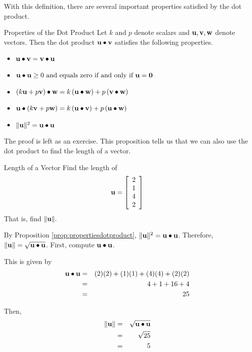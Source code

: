 With this definition, there are several important properties satisfied
by the dot product.

\begin{proposition}{Properties of the Dot Product}\label{prop:propertiesdotproduct}
Let $k $ and $p $  denote scalars and $\mathbf{u},\mathbf{v},\mathbf{w}$ denote vectors.
Then the dot product $\mathbf{u} \bullet \mathbf{v}$ satisfies the following properties.
\begin{itemize}
\item
$\mathbf{u}\bullet \mathbf{v}= \mathbf{v}\bullet \mathbf{u} $
\item
$\mathbf{u}\bullet \mathbf{u}\geq 0 \mbox{ and equals zero if and only if }\mathbf{u}=\mathbf{0}$
\item
$\left( k\mathbf{u}+p\mathbf{v}\right) \bullet \mathbf{w}=k\left( \mathbf{u}\bullet \mathbf{w}\right) +p\left( \mathbf{v}\bullet \mathbf{w}\right)$
\item
$\mathbf{u}\bullet\left( k\mathbf{v}+p\mathbf{w}\right) =k\left(
\mathbf{u}\bullet \mathbf{v}\right) +p\left( \mathbf{u}\bullet \mathbf{w}\right)$
\item
$\| \mathbf{u}\| ^{2}=\mathbf{u}\bullet \mathbf{u} $
\end{itemize}
\end{proposition}

The proof is left as an exercise. This proposition tells us that we can also use the dot product to find the length of a vector.

\begin{example}{Length of a Vector}\label{exa:dotproductlength}
Find the length of
\begin{equation*}
\mathbf{u}
=
\left[ 
\begin{array}{r}
2 \\
1 \\
4 \\
2
\end{array}
\right] 
\end{equation*}
 That is, find $\| \mathbf{u} \| .$
\end{example}

\begin{solution}
By Proposition \ref{prop:propertiesdotproduct},  $\| \mathbf{u} \| ^{2} = \mathbf{u} \bullet \mathbf{u}$. 
Therefore, $\| \mathbf{u} \| = \sqrt {\mathbf{u} \bullet \mathbf{u}}$.
First, compute $\mathbf{u} \bullet \mathbf{u}$. 

This is given by 
\begin{eqnarray*}
\mathbf{u} \bullet \mathbf{u}
&=&
(2)(2) + (1)(1) + (4)(4) + (2)(2) \\
&=&
4 + 1 + 16 + 4 \\
&=&
25
\end{eqnarray*}

Then, 
\begin{eqnarray*}
\| \mathbf{u} \| 
&=& \sqrt {\mathbf{u} \bullet \mathbf{u}} \\
&=& \sqrt{25} \\
&=& 5
\end{eqnarray*}
\end{solution}


